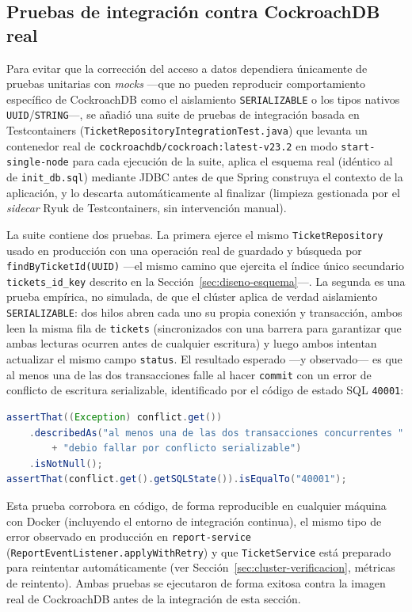 \subsection{Pruebas de integración contra CockroachDB real}

Para evitar que la corrección del acceso a datos dependiera únicamente de pruebas unitarias con
\emph{mocks} —que no pueden reproducir comportamiento específico de CockroachDB como el
aislamiento \texttt{SERIALIZABLE} o los tipos nativos \texttt{UUID}/\texttt{STRING}—, se añadió una
suite de pruebas de integración basada en Testcontainers
(\texttt{TicketRepositoryIntegrationTest.java}) que levanta un contenedor real de
\texttt{cockroachdb/cockroach:latest-v23.2} en modo \texttt{start-single-node} para cada ejecución
de la suite, aplica el esquema real (idéntico al de \texttt{init\_db.sql}) mediante JDBC antes de
que Spring construya el contexto de la aplicación, y lo descarta automáticamente al finalizar
(limpieza gestionada por el \emph{sidecar} Ryuk de Testcontainers, sin intervención manual).

La suite contiene dos pruebas. La primera ejerce el mismo \texttt{TicketRepository} usado en
producción con una operación real de guardado y búsqueda por \texttt{findByTicketId(UUID)} —el
mismo camino que ejercita el índice único secundario \texttt{tickets\_id\_key} descrito en la
Sección~\ref{sec:diseno-esquema}—. La segunda es una prueba empírica, no simulada, de que el
clúster aplica de verdad aislamiento \texttt{SERIALIZABLE}: dos hilos abren cada uno su propia
conexión y transacción, ambos leen la misma fila de \texttt{tickets} (sincronizados con una
barrera para garantizar que ambas lecturas ocurren antes de cualquier escritura) y luego ambos
intentan actualizar el mismo campo \texttt{status}. El resultado esperado —y observado— es que al
menos una de las dos transacciones falle al hacer \texttt{commit} con un error de conflicto de
escritura serializable, identificado por el código de estado SQL \texttt{40001}:

\begin{lstlisting}[language=Java, caption={Extracto de la prueba de conflicto serializable}, label={lst:testcontainers}]
assertThat((Exception) conflict.get())
    .describedAs("al menos una de las dos transacciones concurrentes "
        + "debio fallar por conflicto serializable")
    .isNotNull();
assertThat(conflict.get().getSQLState()).isEqualTo("40001");
\end{lstlisting}

Esta prueba corrobora en código, de forma reproducible en cualquier máquina con Docker
(incluyendo el entorno de integración continua), el mismo tipo de error observado en producción
en \texttt{report-service} (\texttt{ReportEventListener.applyWithRetry}) y que
\texttt{TicketService} está preparado para reintentar automáticamente (ver
Sección~\ref{sec:cluster-verificacion}, métricas de reintento). Ambas pruebas se ejecutaron de
forma exitosa contra la imagen real de CockroachDB antes de la integración de esta sección.

